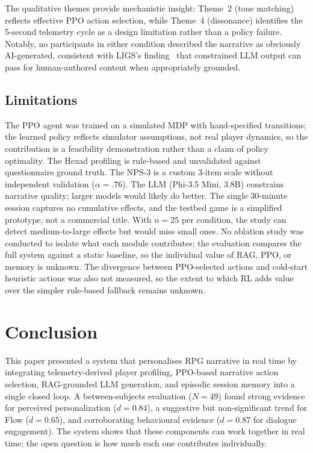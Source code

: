 \documentclass[conference]{IEEEtran}
\begin{document}
The qualitative themes provide mechanistic insight: Theme~2 (tone matching) reflects effective PPO action selection, while Theme~4 (dissonance) identifies the 5-second telemetry cycle as a design limitation rather than a policy failure. Notably, no participants in either condition described the narrative as obviously AI-generated, consistent with LIGS's finding~\cite{ligs2025chi} that constrained LLM output can pass for human-authored content when appropriately grounded.

\subsection{Limitations}

The PPO agent was trained on a simulated MDP with hand-specified transitions; the learned policy reflects simulator assumptions, not real player dynamics, so the contribution is a feasibility demonstration rather than a claim of policy optimality. The Hexad profiling is rule-based and unvalidated against questionnaire ground truth. The NPS-3 is a custom 3-item scale without independent validation ($\alpha = .76$). The LLM (Phi-3.5 Mini, 3.8B) constrains narrative quality; larger models would likely do better. The single 30-minute session captures no cumulative effects, and the testbed game is a simplified prototype, not a commercial title. With $n = 25$ per condition, the study can detect medium-to-large effects but would miss small ones. No ablation study was conducted to isolate what each module contributes; the evaluation compares the full system against a static baseline, so the individual value of RAG, PPO, or memory is unknown. The divergence between PPO-selected actions and cold-start heuristic actions was also not measured, so the extent to which RL adds value over the simpler rule-based fallback remains unknown.

\section{Conclusion}

This paper presented a system that personalises RPG narrative in real time by integrating telemetry-derived player profiling, PPO-based narrative action selection, RAG-grounded LLM generation, and episodic session memory into a single closed loop. A between-subjects evaluation ($N = 49$) found strong evidence for perceived personalization ($d = 0.84$), a suggestive but non-significant trend for Flow ($d = 0.65$), and corroborating behavioural evidence ($d = 0.87$ for dialogue engagement). The system shows that these components can work together in real time; the open question is how much each one contributes individually.
\end{document}
